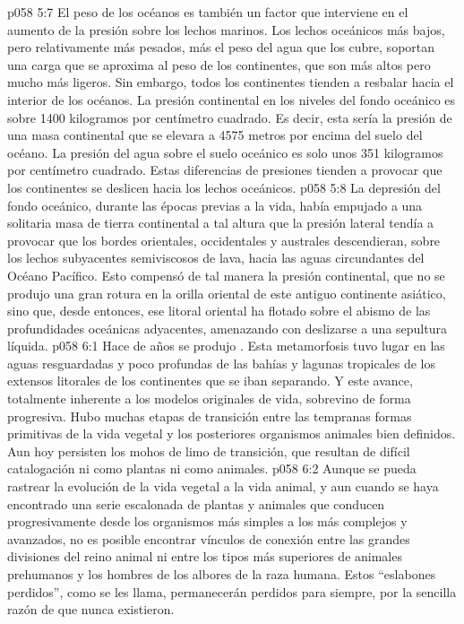 \vs p058 5:7 El peso de los océanos es también un factor que interviene en el aumento de la presión sobre los lechos marinos. Los lechos oceánicos más bajos, pero relativamente más pesados, más el peso del agua que los cubre, soportan una carga que se aproxima al peso de los continentes, que son más altos pero mucho más ligeros. Sin embargo, todos los continentes tienden a resbalar hacia el interior de los océanos. La presión continental en los niveles del fondo oceánico es sobre 1400 kilogramos por centímetro cuadrado. Es decir, esta sería la presión de una masa continental que se elevara a 4575 metros por encima del suelo del océano. La presión del agua sobre el suelo oceánico es solo unos 351 kilogramos por centímetro cuadrado. Estas diferencias de presiones tienden a provocar que los continentes se deslicen hacia los lechos oceánicos.
\vs p058 5:8 La depresión del fondo oceánico, durante las épocas previas a la vida, había empujado a una solitaria masa de tierra continental a tal altura que la presión lateral tendía a provocar que los bordes orientales, occidentales y australes descendieran, sobre los lechos subyacentes semiviscosos de lava, hacia las aguas circundantes del Océano Pacífico. Esto compensó de tal manera la presión continental, que no se produjo una gran rotura en la orilla oriental de este antiguo continente asiático, sino que, desde entonces, ese litoral oriental ha flotado sobre el abismo de las profundidades oceánicas adyacentes, amenazando con deslizarse a una sepultura líquida.
\vs p058 6:1 Hace  de años se produjo . Esta metamorfosis tuvo lugar en las aguas resguardadas y poco profundas de las bahías y lagunas tropicales de los extensos litorales de los continentes que se iban separando. Y este avance, totalmente inherente a los modelos originales de vida, sobrevino de forma progresiva. Hubo muchas etapas de transición entre las tempranas formas primitivas de la vida vegetal y los posteriores organismos animales bien definidos. Aun hoy persisten los mohos de limo de transición, que resultan de difícil catalogación ni como plantas ni como animales.
\vs p058 6:2 \pc Aunque se pueda rastrear la evolución de la vida vegetal a la vida animal, y aun cuando se haya encontrado una serie escalonada de plantas y animales que conducen progresivamente desde los organismos más simples a los más complejos y avanzados, no es posible encontrar vínculos de conexión entre las grandes divisiones del reino animal ni entre los tipos más superiores de animales prehumanos y los hombres de los albores de la raza humana. Estos “eslabones perdidos”, como se les llama, permanecerán perdidos para siempre, por la sencilla razón de que nunca existieron.
